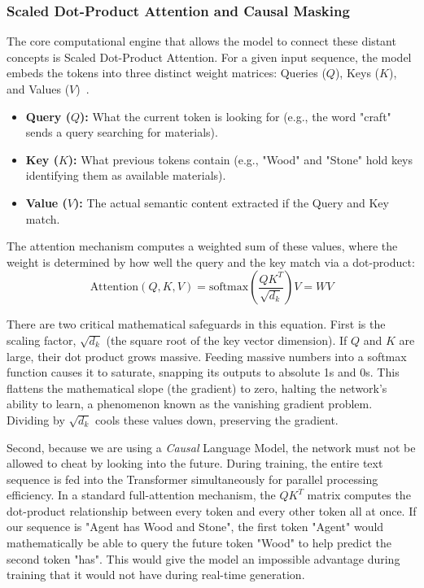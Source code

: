 \subsubsection{Scaled Dot-Product Attention and Causal Masking}

The core computational engine that allows the model to connect these distant concepts is Scaled Dot-Product Attention. For a given input sequence, the model embeds the tokens into three distinct weight matrices: Queries ($Q$), Keys ($K$), and Values ($V$)~\parencite{Vaswani_Shazeer_Parmar_Uszkoreit_Jones_Gomez_Kaiser_Polosukhin_2017}. 
\begin{itemize}
    \item \textbf{Query ($Q$):} What the current token is looking for (e.g., the word "craft" sends a query searching for materials).
    \item \textbf{Key ($K$):} What previous tokens contain (e.g., "Wood" and "Stone" hold keys identifying them as available materials).
    \item \textbf{Value ($V$):} The actual semantic content extracted if the Query and Key match.
\end{itemize}

The attention mechanism computes a weighted sum of these values, where the weight is determined by how well the query and the key match via a dot-product:
\begin{equation}
\label{eq:self_attention}
    \text{Attention}(Q, K, V) = \text{softmax}\left(\frac{Q K^T}{\sqrt{d_k}}\right) V = W V
\end{equation}

There are two critical mathematical safeguards in this equation. First is the scaling factor, $\sqrt{d_k}$ (the square root of the key vector dimension). If $Q$ and $K$ are large, their dot product grows massive. Feeding massive numbers into a softmax function causes it to saturate, snapping its outputs to absolute 1s and 0s. This flattens the mathematical slope (the gradient) to zero, halting the network's ability to learn, a phenomenon known as the vanishing gradient problem. Dividing by $\sqrt{d_k}$ cools these values down, preserving the gradient.

Second, because we are using a \emph{Causal} Language Model, the network must not be allowed to cheat by looking into the future. During training, the entire text sequence is fed into the Transformer simultaneously for parallel processing efficiency. In a standard full-attention mechanism, the $Q K^T$ matrix computes the dot-product relationship between every token and every other token all at once. If our sequence is "Agent has Wood and Stone", the first token "Agent" would mathematically be able to query the future token "Wood" to help predict the second token "has". This would give the model an impossible advantage during training that it would not have during real-time generation.

